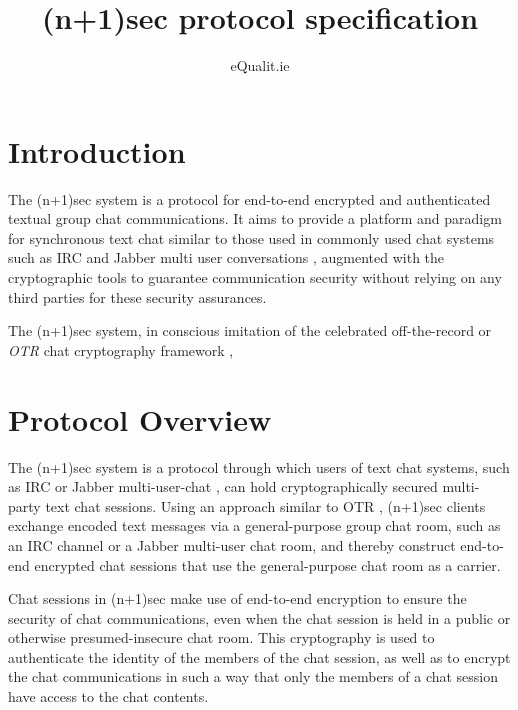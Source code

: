 \documentclass{article}
\title{(n+1)sec protocol specification}
\author{eQualit.ie}
\begin{document}
\maketitle

\section{Introduction}
\label{sec:introduction}

The (n+1)sec system is a protocol for end-to-end encrypted and authenticated textual group chat communications.
It aims to provide a platform and paradigm for synchronous text chat similar to those used in commonly used chat systems such as IRC \cite{irc} and Jabber multi user conversations \cite{jabber}, augmented with the cryptographic tools to guarantee communication security without relying on any third parties for these security assurances.

The (n+1)sec system, in conscious imitation of the celebrated off-the-record or \emph{OTR} chat cryptography framework \cite{otr}, 







\section{Protocol Overview}
\label{sec:protocol-overview}

The (n+1)sec system is a protocol through which users of text chat systems, such as IRC \cite{irc} or Jabber multi-user-chat \cite{jabber}, can hold cryptographically secured multi-party text chat sessions.
Using an approach similar to OTR \cite{otr}, (n+1)sec clients exchange encoded text messages via a general-purpose group chat room, such as an IRC channel or a Jabber multi-user chat room, and thereby construct end-to-end encrypted chat sessions that use the general-purpose chat room as a carrier.

Chat sessions in (n+1)sec make use of end-to-end encryption to ensure the security of chat communications, even when the chat session is held in a public or otherwise presumed-insecure chat room.
This cryptography is used to authenticate the identity of the members of the chat session, as well as to encrypt the chat communications in such a way that only the members of a chat session have access to the chat contents.
\end{document}
